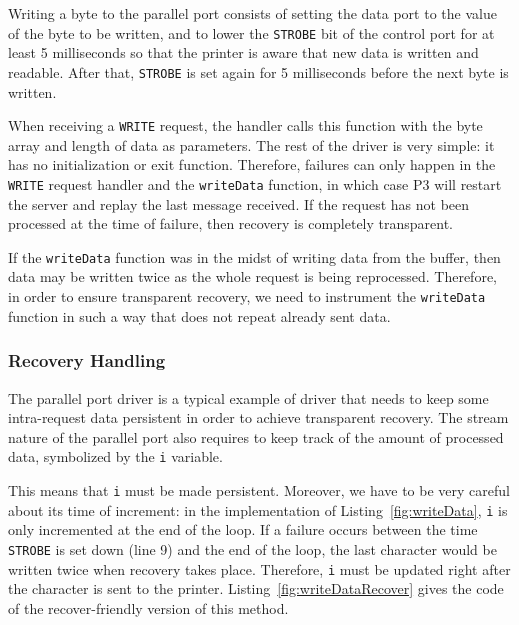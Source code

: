 \documentclass{report}
\begin{document}


Writing a byte to the parallel port consists of setting the data port to the value of the byte to be written, and to lower the \texttt{STROBE} bit of the control port for at least 5 milliseconds so that the printer is aware that new data is written and readable. After that, \texttt{STROBE} is set again for 5 milliseconds before the next byte is written.

When receiving a \texttt{WRITE} request, the handler calls this function with the byte array and length of data as parameters. The rest of the driver is very simple: it has no initialization or exit function. Therefore, failures can only happen in the \texttt{WRITE} request handler and the \texttt{writeData} function, in which case P3 will restart the server and replay the last message received. If the request has not been processed at the time of failure, then recovery is completely transparent.

If the \texttt{writeData} function was in the midst of writing data from the buffer, then data may be written twice as the whole request is being reprocessed. Therefore, in order to ensure transparent recovery, we need to instrument the \texttt{writeData} function in such a way that does not repeat already sent data.

\subsubsection{Recovery Handling}
The parallel port driver is a typical example of driver that needs to keep some intra-request data persistent in order to achieve transparent recovery. The stream nature of the parallel port also requires to keep track of the amount of processed data, symbolized by the \texttt{i} variable.

This means that \texttt{i} must be made persistent. Moreover, we have to be very careful about its time of increment: in the implementation of Listing~\ref{fig:writeData}, \texttt{i} is only incremented at the end of the loop. If a failure occurs between the time \texttt{STROBE} is set down (line 9) and the end of the loop, the last character would be written twice when recovery takes place. Therefore, \texttt{i} must be updated right after the character is sent to the printer. Listing~\ref{fig:writeDataRecover} gives the code of the recover-friendly version of this method.
\end{document}
